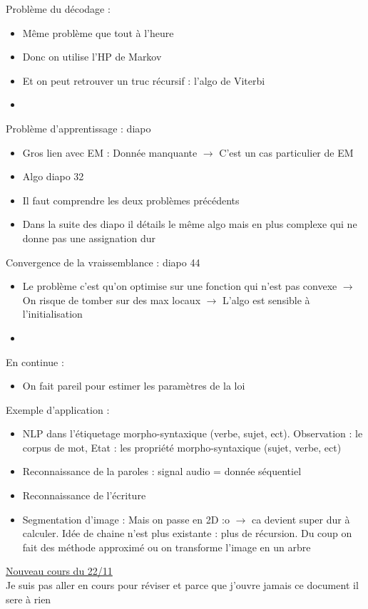 \documentclass{article}
\theoremstyle{plain}%
\theoremstyle{definition}
\theoremstyle{remark}
\begin{document}
Problème du décodage : 
\begin{itemize}
    \item Même problème que tout à l'heure
    \item Donc on utilise l'HP de Markov
    \item Et on peut retrouver un truc récursif : l'algo de Viterbi
    \item 
\end{itemize}

Problème d'apprentissage : diapo
\begin{itemize}
    \item Gros lien avec EM : Donnée manquante $\rightarrow$ C'est un cas particulier de EM
    \item Algo diapo 32 
    \item Il faut comprendre les deux problèmes précédents
    \item Dans la suite des diapo il détails le même algo mais en plus complexe qui ne donne pas une assignation dur
\end{itemize}

Convergence de la vraissemblance : diapo 44
\begin{itemize}
    \item Le problème c'est qu'on optimise sur une fonction qui n'est pas convexe $\rightarrow$ On risque de tomber sur des max locaux $\rightarrow$ L'algo est sensible à l'initialisation
    \item 
\end{itemize}

En continue : 
\begin{itemize}
    \item On fait pareil pour estimer les paramètres de la loi
\end{itemize}

Exemple d'application : 
\begin{itemize}
    \item NLP dans l'étiquetage morpho-syntaxique (verbe, sujet, ect). Observation : le corpus de mot, Etat : les propriété morpho-syntaxique (sujet, verbe, ect)
    \item Reconnaissance de la paroles : signal audio = donnée séquentiel
    \item Reconnaissance de l'écriture
    \item Segmentation d'image : Mais on passe en 2D :o $\rightarrow$ ca devient super dur à calculer. Idée de chaine n'est plus existante : plus de récursion. Du coup on fait des méthode approximé ou on transforme l'image en un arbre
\end{itemize}

\underline{Nouveau cours du 22/11} \\
Je suis pas aller en cours pour réviser et parce que j'ouvre jamais ce document il sere à rien
\end{document}
